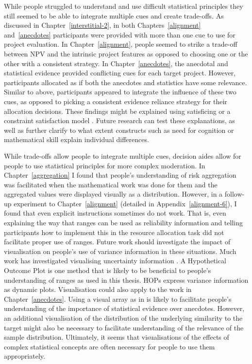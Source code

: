 \documentclass[a4paper, nobind, dvipsnames]{templates/ociamthesis}
\theoremstyle{definition}
\theoremstyle{definition}
\theoremstyle{definition}
\theoremstyle{definition}
\theoremstyle{remark}
\begin{document}
While people struggled to understand and use difficult statistical principles
they still seemed to be able to integrate multiple cues and create trade-offs.
As discussed in Chapter~\ref{interstitial-2}, in both Chapters~\ref{alignment}
and~\ref{anecdotes} participants were provided with more than one cue to use
for project evaluation. In Chapter~\ref{alignment}, people seemed to strike a
trade-off between NPV and the intrinsic project features as opposed to choosing
one or the other with a consistent strategy. In Chapter~\ref{anecdotes}, the
anecdotal and statistical evidence provided conflicting cues for each target
project. However, participants allocated as if both the anecdotes and statistics
have some relevance. Similar to above, participants appeared to integrate the
influence of these two cues, as opposed to picking a consistent evidence
reliance strategy for their allocation decisions. These findings might be
explained using satisficing \autocite{simon1955} or a constraint satisfaction model
\autocite[e.g.,][]{glockner2014}. Future research can test these explanations, as well as
further clarify to what extent constructs such as need for cognition or
mathematical skill explain individual differences.

While trade-offs allow people to integrate multiple cues, decision aides allow
for people to use statistical principles for more complex moderation. In
Chapter~\ref{aggregation} I found that people's understanding of risk
aggregation was facilitated when the mathematical work was done for them and the
aggregated values were displayed visually as a distribution. However, in a
follow-up experiment to Chapter~\ref{alignment} (detailed in
Appendix~\ref{alignment-6}), I found that even explicit instructions sometimes
do not work. That is, even explaining the way that ranges can be used as
reliability information and telling participants how to implement this in the
resource allocation task did not facilitate proper use of ranges. Future work
should investigate the impact of visualisation on people's use of variance
information in these situations. Much work has investigated visualising
uncertainty information \autocite{bostrom2008,maceachren1992,kinkeldey2017,padilla2018,davis1997,ristovski2014,brodlie2012,johnson2003,potter2012,lipkus1999,lipkus2007,spiegelhalter2011,pang1997,kox2018,lapinski2009,torsneyweir2015}. A Hypothetical Outcome Plot \autocites[HOP;][]{kale2019,hullman2015} is one method that is likely to be beneficial to people's
understanding of ranges as used in this thesis. HOPs express variance
information as dynamic plots. Visualisation could also apply to the work in
Chapter~\ref{anecdotes}. Using a visual array as in \textcite{jaramillo2019} is likely to
facilitate people's understanding of the importance of statistical evidence over
anecdotes. However, an additional visualisation of the distribution of the
underlying similarity to the target might also be necessary to facilitate
understanding of the relevance of the sample distribution. Ultimately, it seems
that visualisations of the effects of complex statistical concepts are often
necessary for people to use them appropriately.
\end{document}
